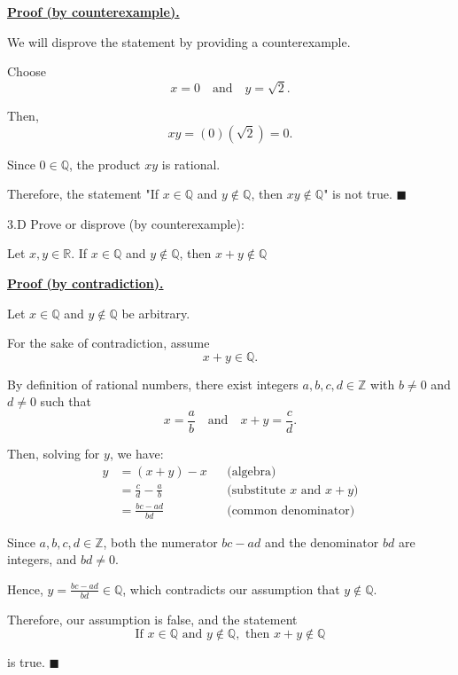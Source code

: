 \documentclass[]{article}
\begin{document}
\underline{\textbf{Proof (by counterexample).}}  

We will disprove the statement by providing a counterexample.  

Choose 
\[
x = 0 \quad \text{and} \quad y = \sqrt{2}.
\]

Then, 
\[
xy = (0)(\sqrt{2}) = 0.
\]

Since \(0 \in \mathbb{Q}\), the product \(xy\) is rational.  

Therefore, the statement "If \(x \in \mathbb{Q}\) and \(y \notin \mathbb{Q}\), then \(xy \notin \mathbb{Q}\)" is not true. \(\blacksquare\)

\begin{question}{3.D}
    Prove or disprove (by counterexample):
        \begin{center}
            Let $x, y \in \mathbb{R}$. If $x \in \mathbb{Q}$ and $y \notin \mathbb{Q}$, then $x + y \notin \mathbb{Q}$
        \end{center}
\end{question}

\underline{\textbf{Proof (by contradiction).}}  

Let \(x \in \mathbb{Q}\) and \(y \notin \mathbb{Q}\) be arbitrary.  

For the sake of contradiction, assume
\[
x + y \in \mathbb{Q}.
\]

By definition of rational numbers, there exist integers \(a, b, c, d \in \mathbb{Z}\) with \(b \neq 0\) and \(d \neq 0\) such that
\[
x = \frac{a}{b} \quad \text{and} \quad x + y = \frac{c}{d}.
\]

Then, solving for \(y\), we have:
\begin{align*}
y &= (x+y) - x && \text{(algebra)} \\[1mm]
  &= \frac{c}{d} - \frac{a}{b} && \text{(substitute \(x\) and \(x+y\))} \\[1mm]
  &= \frac{bc - ad}{bd} && \text{(common denominator)}
\end{align*}

Since \(a, b, c, d \in \mathbb{Z}\), both the numerator \(bc - ad\) and the denominator \(bd\) are integers, and \(bd \neq 0\).  

Hence, \(y = \frac{bc - ad}{bd} \in \mathbb{Q}\), which contradicts our assumption that \(y \notin \mathbb{Q}\).  

Therefore, our assumption is false, and the statement  
\[
\text{If } x \in \mathbb{Q} \text{ and } y \notin \mathbb{Q}, \text{ then } x+y \notin \mathbb{Q}
\] 

is true. \(\blacksquare\)
\end{document}
